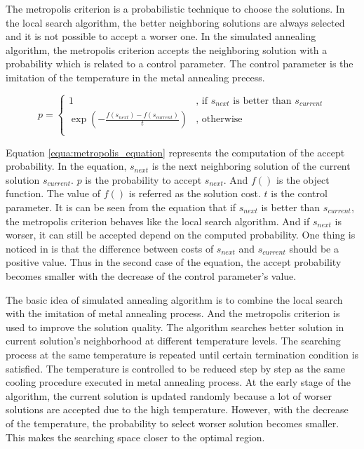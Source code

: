		The metropolis criterion is a probabilistic technique to choose the solutions.
		In the local search algorithm, the better neighboring solutions are always selected
		and it is not possible to accept a worser one. In the simulated annealing
		algorithm, the metropolis criterion accepts the neighboring solution with a 
		probability which is related to a control parameter. The control parameter
		is the imitation of the temperature in the metal annealing precess.
	
		\begin{equation}
			p=
				\begin{cases}
					1 & \text{, if } s_{next} \text{ is better than } s_{current}\\
					\exp{\left( -\frac{f(s_{next})-f(s_{current})}{t} \right)} & \text{, otherwise}\\
			\end{cases}
		\label{equa:metropolis_equation}
		\end{equation}
		
		Equation \ref{equa:metropolis_equation} represents the computation of the accept
		probability. In the equation, $s_{next}$ is the next neighboring solution of the
		current solution $s_{current}$. $p$ is the probability to accept $s_{next}$.
		And $f()$ is the object function. The value of $f()$ is referred as the
		solution cost. $t$ is the control parameter. It is can be seen from the equation
		that if $s_{next}$ is better than $s_{current}$, the metropolis criterion behaves
		like the local search algorithm. And if $s_{next}$ is worser, it can still be accepted
		depend on the computed probability. One thing is noticed in \cite{10.2307/1690046}
		is that the difference between costs of $s_{next}$ and $s_{current}$ should be a
		positive value. Thus in the second case of the equation, the accept probability
		becomes smaller with the decrease of the control parameter's value.
		
		The basic idea of simulated annealing algorithm is to combine the local search
		with the imitation of metal annealing process. And the metropolis criterion is
		used to improve the solution quality.
		The algorithm searches better solution in current solution's neighborhood at 
		different temperature levels.
		The searching process at the same temperature is repeated until certain termination
		condition is satisfied. The temperature is controlled to be reduced step by step
		as the same cooling procedure executed in metal annealing process. At the early
		stage of the algorithm, the current solution is updated randomly because a lot of
		worser solutions are accepted due to the high temperature. However, with
		the decrease of the temperature, the probability to select worser solution becomes
		smaller. This makes the searching space closer to the optimal region.
		
